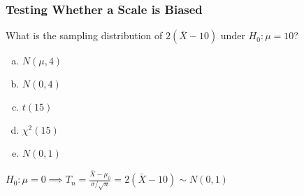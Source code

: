 \documentclass{beamer}
\begin{document}
\begin{frame}[t]

	\frametitle{Testing Whether a Scale is Biased }

	\vspace{2em}

	What is the sampling distribution of $2(\bar{X}-10)$ under $H_0\colon \mu = 10$? 

	\vspace{1em}

	\begin{enumerate}[(a)]
		\item $N(\mu, 4)$  
		\item $N(0, 4)$  
		\item $t(15)$  
		\item $\chi^2(15)$  
		\item $N(0,1)$  
	\end{enumerate}

	\pause
	\alert{$H_0\colon \mu = 0 \implies \displaystyle T_n = \frac{\bar{X} - \mu_0}{\sigma/\sqrt{n}} =  2(\bar{X} - 10)\sim N(0,1)$}
\end{frame}
\end{document}
